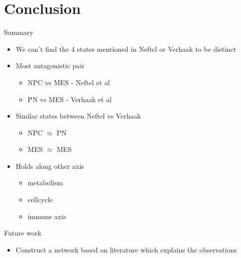 \documentclass[aspectratio=169,9pt]{beamer}
\begin{document}
    \section{Conclusion}

    \begin{frame}{Summary}
        \begin{itemize}
            \item We can't find the 4 states mentioned in Neftel or Verhaak to be distinct
            \pause \item Most antagonistic pair
            \begin{itemize}
                \item NPC vs MES - Neftel et al
                \item PN vs MES - Verhaak et al
            \end{itemize}
            \pause \item Similar states between Neftel vs Verhaak
            \begin{itemize}
                \item NPC $\approx$ PN
                \item MES $\approx$ MES
            \end{itemize}
            \pause \item Holds along other axis
            \begin{itemize}
                \item metabolism
                \item cellcycle
                \item immune axis
            \end{itemize}

        \end{itemize}
    \end{frame}

    \begin{frame}{Future work}
        \begin{itemize}
            \item Construct a network based on literature which explains the observations
        \end{itemize}
    \end{frame}

    \begin{frame}[allowframebreaks]
        \printbibliography
    \end{frame}
\end{document}
